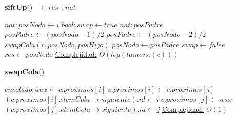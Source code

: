 \begin{algorithm}[H]{\textbf{siftUp}() $\to$ $res$ : $nat$ }
    	\begin{algorithmic}[1]
			\State $nat: posNodo \gets i $ 
			     	
				\State $bool: swap \gets true $ 				
				\State $nat: posPadre $ 				
				 							
					 									
						\State $posPadre \gets (posNodo - 1)/2 $ 											
					\Else
						\State $posPadre \gets (posNodo - 2)/2 $ 		
					\EndIf		
					 					
						\State $swapCola(c,posNodo,posHijo)$ 							
						\State $posNodo \gets posPadre$ 
					\Else
						\State $swap \gets false$ 						
					\EndIf
				\EndWhile
			\EndIf    	
			\State $res \gets posNodo$ 
			\medskip
			\Statex \underline{Complejidad:} $\Theta(log(tamano(c)))$
    	\end{algorithmic}
\end{algorithm}

\begin{algorithm}[H]{\textbf{swapCola}()}
   	\begin{algorithmic}[1]
			\State $encolado: aux \gets c.proximos[i] $ 
			\State $c.proximos[i] \gets c.proximos[j]$ 
			\State $(c.proximos[i].elemCola \rightarrow siguiente).id \gets i$ 
			\State $c.proximos[j] \gets aux$ 			
			\State $(c.proximos[j].elemCola \rightarrow siguiente).id \gets j$ 
			\Statex \underline{Complejidad:} $\Theta(1)$
   	\end{algorithmic}
\end{algorithm}    	
    	
